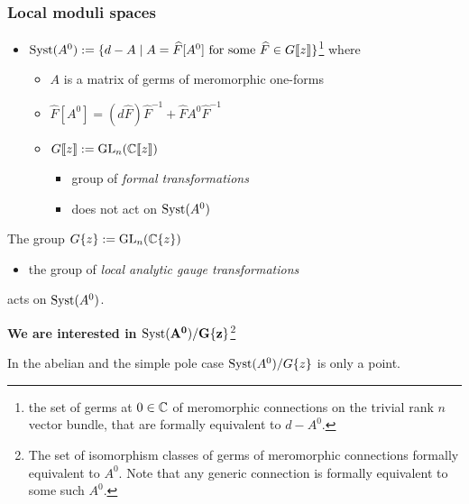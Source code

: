\subsubsection{Local moduli spaces} %
\begin{defn}
  \begin{itemize}
    \item $\operatorname{Syst}(A^0):=\{d-A \mid A=\widehat{F}[A^0] \text{ for some } \widehat{F}\in
      G\llbracket z\rrbracket\}$\footnote{the set of germs at $0\in\mathbb{C}$ of
      meromorphic connections on the trivial rank $n$ vector bundle, that are
      formally equivalent to $d-A^0$.}
      where
      \begin{itemize}
        \item $A$ is a matrix of germs of meromorphic one-forms
        \item $\hat{F}[A^0]=(d\hat{F})\hat{F}^{-1}+\hat{F}A^0\hat{F}^{-1}$
        \item $G\llbracket z\rrbracket:=\operatorname{GL}_n(\mathbb{C}\llbracket z\rrbracket)$
          \begin{itemize}
            \item group of \emph{formal transformations}
            \item does not act on $\operatorname{Syst}(A^0)$
          \end{itemize}
      \end{itemize}
  \end{itemize}
  The group $G\{z\}:=\operatorname{GL}_n(\mathbb{C}\{z\})$
  \begin{itemize}
    \item the group of \emph{local analytic gauge transformations}
  \end{itemize}
  acts on $\operatorname{Syst}(A^0)$.
  \begin{center}
    \textbf{We are interested in $\bf\operatorname{Syst}(A^0)/G\{z\}$}\footnote{The set of
    isomorphism classes of germs of meromorphic connections formally equivalent
    to $A^0$. Note that any generic connection is formally equivalent to some
    such $A^0$.}
  \end{center}
\end{defn}
\begin{rem}
  In the abelian and the simple pole case $\operatorname{Syst}(A^0)/G\{z\}$ is only a point.
\end{rem}
